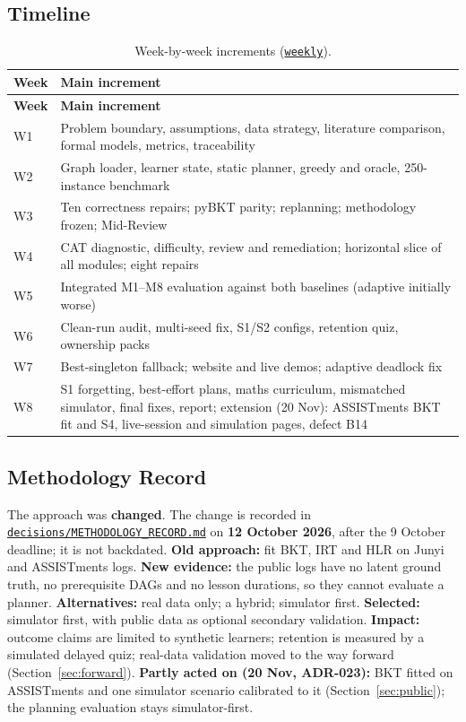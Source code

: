 \documentclass[english]{sintr}
\newcommand{\repourl}{https://github.com/Bhuvan-56/adaptive-learning-path-planner-DAT}
\newcommand{\sha}{cs5903-final-2026}
\DeclareRobustCommand{\rf}[1]{\href{\repourl/blob/\sha/#1}{\nolinkurl{#1}}}
\DeclareRobustCommand{\rd}[1]{\href{\repourl/tree/\sha/#1}{\nolinkurl{#1}}}
\begin{document}
\subsection{Timeline}
{\small
\begin{longtable}{|C{1.17cm}|L{14.29cm}|}
\caption{Week-by-week increments (\rd{weekly}).}\\
\hline
\textbf{Week} & \textbf{Main increment} \\ \hline
\endfirsthead
\hline \textbf{Week} & \textbf{Main increment} \\ \hline
\endhead
W1 & Problem boundary, assumptions, data strategy, literature comparison, formal models, metrics, traceability \\ \hline
W2 & Graph loader, learner state, static planner, greedy and oracle, 250-instance benchmark \\ \hline
W3 & Ten correctness repairs; pyBKT parity; replanning; methodology frozen; Mid-Review \\ \hline
W4 & CAT diagnostic, difficulty, review and remediation; horizontal slice of all modules; eight repairs \\ \hline
W5 & Integrated M1--M8 evaluation against both baselines (adaptive initially worse) \\ \hline
W6 & Clean-run audit, multi-seed fix, S1/S2 configs, retention quiz, ownership packs \\ \hline
W7 & Best-singleton fallback; website and live demos; adaptive deadlock fix \\ \hline
W8 & S1 forgetting, best-effort plans, maths curriculum, mismatched simulator, final fixes, report; extension (20 Nov): ASSISTments BKT fit and S4, live-session and simulation pages, defect B14 \\ \hline
\end{longtable}
}

\subsection{Methodology Record}
\label{sec:method-record}
The approach was \textbf{changed}. The change is recorded in \rf{decisions/METHODOLOGY_RECORD.md} on \textbf{12 October 2026}, after the 9 October deadline; it is not backdated. \textbf{Old approach:} fit BKT, IRT and HLR on Junyi and ASSISTments logs. \textbf{New evidence:} the public logs have no latent ground truth, no prerequisite DAGs and no lesson durations, so they cannot evaluate a planner. \textbf{Alternatives:} real data only; a hybrid; simulator first. \textbf{Selected:} simulator first, with public data as optional secondary validation. \textbf{Impact:} outcome claims are limited to synthetic learners; retention is measured by a simulated delayed quiz; real-data validation moved to the way forward (Section~\ref{sec:forward}). \textbf{Partly acted on (20 Nov, ADR-023):} BKT fitted on ASSISTments and one simulator scenario calibrated to it (Section~\ref{sec:public}); the planning evaluation stays simulator-first.
\end{document}
